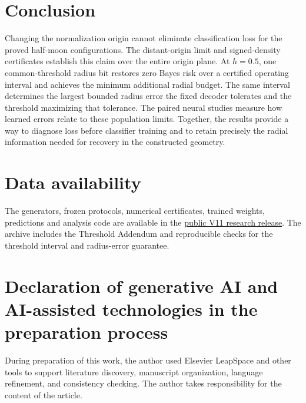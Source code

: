 \documentclass[a4paper,fleqn]{cas-dc}
\begin{document}
\section{Conclusion}
Changing the normalization origin cannot eliminate classification loss for the proved half-moon configurations. The distant-origin limit and signed-density certificates establish this claim over the entire origin plane. At $h=0.5$, one common-threshold radius bit restores zero Bayes risk over a certified operating interval and achieves the minimum additional radial budget. The same interval determines the largest bounded radius error the fixed decoder tolerates and the threshold maximizing that tolerance. The paired neural studies measure how learned errors relate to these population limits. Together, the results provide a way to diagnose loss before classifier training and to retain precisely the radial information needed for recovery in the constructed geometry.
\section*{Data availability}
The generators, frozen protocols, numerical certificates, trained weights, predictions and analysis code are available in the \href{https://github.com/Meshaal-Mouawad/HalfMoon-Direction-Normalization/releases/tag/v11-submission}{public V11 research release}. The archive includes the Threshold Addendum and reproducible checks for the threshold interval and radius-error guarantee.
\section*{Declaration of generative AI and AI-assisted technologies in the preparation process}
During preparation of this work, the author used Elsevier LeapSpace and other tools to support literature discovery, manuscript organization, language refinement, and consistency checking. The author takes responsibility for the content of the article.


\end{document}
